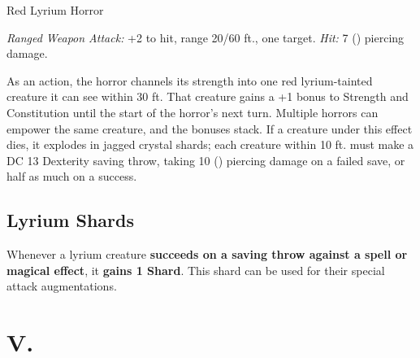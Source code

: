 \documentclass[letterpaper,twocolumn,openany,nodeprecatedcode,breakable,skins,xparse,most]{dndbook}
\begin{document}
\begin{monsterbox}{Red Lyrium Horror}
\begin{rpg-monsteraction}
\textit{Ranged Weapon Attack:} +2 to hit, range 20/60 ft., one target. \textit{Hit:} 7 () piercing damage.
\end{rpg-monsteraction}

\begin{rpg-monsteraction}
As an action, the horror channels its strength into one red lyrium-tainted creature it can see within 30 ft. That creature gains a +1 bonus to Strength and Constitution until the start of the horror's next turn. Multiple horrors can empower the same creature, and the bonuses stack. If a creature under this effect dies, it explodes in jagged crystal shards; each creature within 10 ft. must make a DC 13 Dexterity saving throw, taking 10 () piercing damage on a failed save, or half as much on a success.
\end{rpg-monsteraction}

\end{monsterbox}

\newpage

\subsection{Lyrium Shards}

Whenever a lyrium creature \textbf{succeeds on a saving throw against a spell or magical effect},
it \textbf{gains 1 Shard}. This shard can be used for their special attack augmentations.

\newpage

\section{V.}
\end{document}
